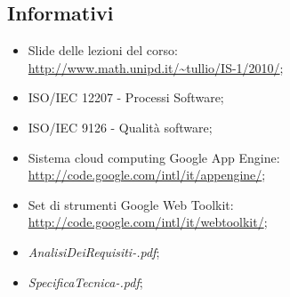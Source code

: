 \subsection{Informativi}
\begin{itemize}
  \item Slide delle lezioni del corso:\\
  \url{http://www.math.unipd.it/~tullio/IS-1/2010/};
  \item ISO/IEC 12207 - Processi Software;
  \item ISO/IEC 9126 - Qualit\`a software;
  \item Sistema cloud computing Google App Engine:\\
  \url{http://code.google.com/intl/it/appengine/};
  \item Set di strumenti Google Web Toolkit:\\
  \url{http://code.google.com/intl/it/webtoolkit/};
  \item \emph{AnalisiDeiRequisiti-\versioneAR.pdf};
  \item \emph{SpecificaTecnica-\versionespecifica.pdf};
\end{itemize}
